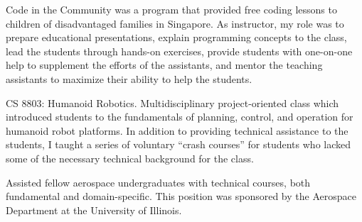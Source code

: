 
Code in the Community was a program that provided free coding lessons to children of disadvantaged families in Singapore. As instructor, my role was to prepare educational presentations, explain programming concepts to the class, lead the students through hands-on exercises, provide students with one-on-one help to supplement the efforts of the assistants, and mentor the teaching assistants to maximize their ability to help the students.

\divider

CS 8803: Humanoid Robotics. Multidisciplinary project-oriented class which introduced students to the fundamentals of planning, control, and operation for humanoid robot platforms. In addition to providing technical assistance to the students, I taught a series of voluntary ``crash courses'' for students who lacked some of the necessary technical background for the class.

\divider

Assisted fellow aerospace undergraduates with technical courses, both fundamental and domain-specific. This position was sponsored by the Aerospace Department at the University of Illinois.
